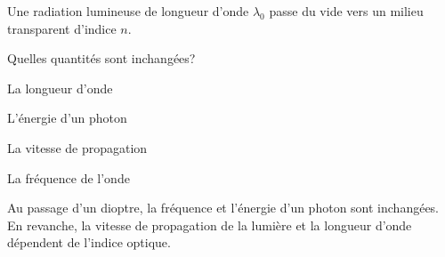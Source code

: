 	
	\debutEntrainement
	
	
	\begin{enonce}
		Une radiation lumineuse de longueur d'onde $\lambda_0$ passe du vide vers un milieu transparent d'indice $n$. 
		
		Quelles quantités sont inchangées?
		
		\begin{listeQCM2Colonnes}
			\item La longueur d'onde
			\item L'énergie d'un photon
			\item La vitesse de propagation
			\item La fréquence de l'onde
		\end{listeQCM2Colonnes}
		
	\end{enonce}
	
	
	\begin{corrige}
		Au passage d'un dioptre, la fréquence et l'énergie d'un photon sont inchangées. En revanche, la vitesse de propagation de la lumière et la longueur d'onde dépendent de l'indice optique.
	\end{corrige}
	
	
	\finEntrainement
	
	
	
	
	\hauteurLargeurCadreReponse		{8mm}{3cm}
	\initialisationEntrainement
	
